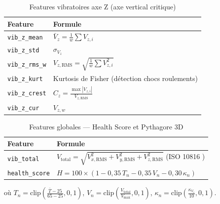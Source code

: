 \documentclass[12pt,a4paper]{report}
\begin{document}
\begin{table}[H]
\centering
\caption{Features vibratoires axe Z (axe vertical critique)}
\begin{tabular}{ll}
\toprule
\textbf{Feature} & \textbf{Formule} \\
\midrule
\texttt{vib\_z\_mean}  & $\bar{V}_z = \frac{1}{w}\sum V_{z,i}$ \\
\texttt{vib\_z\_std}   & $\sigma_{V_z}$ \\
\texttt{vib\_z\_rms\_w} & $V_{z,\text{RMS}} = \sqrt{\frac{1}{w}\sum V_{z,i}^2}$ \\
\texttt{vib\_z\_kurt}  & Kurtosis de Fisher (détection chocs roulements) \\
\texttt{vib\_z\_crest} & $C_z = \frac{\max|V_{z,i}|}{V_{z,\text{RMS}}}$ \\
\texttt{vib\_z\_cur}   & $V_{z,w}$ \\
\bottomrule
\end{tabular}
\end{table}

\begin{table}[H]
\centering
\caption{Features globales — Health Score et Pythagore 3D}
\begin{tabular}{ll}
\toprule
\textbf{Feature} & \textbf{Formule} \\
\midrule
\texttt{vib\_total}    & $V_{\text{total}} = \sqrt{V_{x,\text{RMS}}^2 + V_{y,\text{RMS}}^2 + V_{z,\text{RMS}}^2}$ (ISO 10816 \cite{iso10816}) \\[4pt]
\texttt{health\_score} & $H = 100 \times (1 - 0{,}35\,T_n - 0{,}35\,V_n - 0{,}30\,\kappa_n)$ \\
\bottomrule
\end{tabular}
\end{table}

\noindent où $T_n = \text{clip}\!\left(\frac{\bar{T}-25}{65-25}, 0, 1\right)$,
$V_n = \text{clip}\!\left(\frac{V_{\text{total}}}{V_{\text{max}}}, 0, 1\right)$,
$\kappa_n = \text{clip}\!\left(\frac{\kappa_{V_z}}{10}, 0, 1\right)$.
\end{document}
